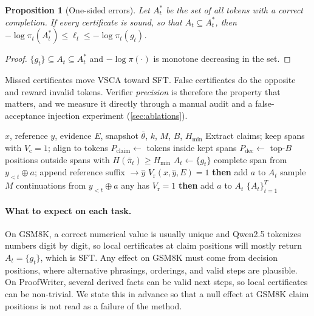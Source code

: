 \documentclass{article}
\newcommand{\vsca}{\textsc{VSCA}}
\newcommand{\acc}{A}
\theoremstyle{plain}
\newtheorem{proposition}{Proposition}
\theoremstyle{remark}
\begin{document}
\begin{proposition}[One-sided errors]
\label{prop:conservative}
Let $\acc^*_t$ be the set of all tokens with a correct completion. If every certificate is sound, so that $\acc_t\subseteq \acc^*_t$, then $-\log\pi_t(\acc^*_t)\leq \ell_t\leq -\log\pi_t(g_t)$.
\end{proposition}
\begin{proof}
$\{g_t\}\subseteq \acc_t\subseteq \acc^*_t$ and $-\log\pi(\cdot)$ is monotone decreasing in the set.
\end{proof}
Missed certificates move \vsca{} toward SFT. False certificates do the opposite and reward invalid tokens. Verifier \emph{precision} is therefore the property that matters, and we measure it directly through a manual audit and a false-acceptance injection experiment (\cref{sec:ablations}).

\begin{algorithm}[tb]
\caption{Building certified acceptance sets for one response}
\label{alg:certify}
\begin{algorithmic}
 $x$, reference $y$, evidence $E$, snapshot $\bar\theta$, $k$, $M$, $B$, $H_{\min}$
\STATE Extract claims; keep spans with $V_{\mathrm{c}}=1$; align to tokens
\STATE $P_{\mathrm{claim}}\leftarrow$ tokens inside kept spans
\STATE $P_{\mathrm{dec}}\leftarrow$ top-$B$ positions outside spans with $H(\bar\pi_t)\geq H_{\min}$
\STATE $\acc_t\leftarrow\{g_t\}$
\STATE complete span from $y_{<t}\oplus a$; append reference suffix $\rightarrow \hat y$
 $V_{\mathrm{r}}(x,\hat y,E)=1$ {\bfseries then} add $a$ to $\acc_t$
\ELSE
\STATE sample $M$ continuations from $y_{<t}\oplus a$
 any has $V_{\mathrm{r}}=1$ {\bfseries then} add $a$ to $\acc_t$
\ENDIF
\ENDFOR
\ENDIF
\ENDFOR
{} $\{\acc_t\}_{t=1}^{T}$
\end{algorithmic}
\end{algorithm}

\paragraph{What to expect on each task.} On GSM8K, a correct numerical value is usually unique and Qwen2.5 tokenizes numbers digit by digit, so local certificates at claim positions will mostly return $\acc_t=\{g_t\}$, which is SFT. Any effect on GSM8K must come from decision positions, where alternative phrasings, orderings, and valid steps are plausible. On ProofWriter, several derived facts can be valid next steps, so local certificates can be non-trivial. We state this in advance so that a null effect at GSM8K claim positions is not read as a failure of the method.
\end{document}
